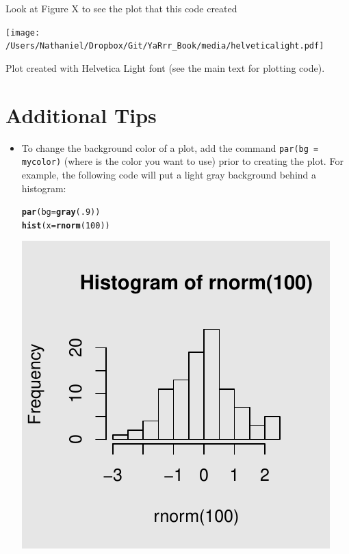 \documentclass{tufte-book}\usepackage[]{graphicx}\usepackage[]{color}
\makeatletter
\def\maxwidth{ %
  \ifdim\Gin@nat@width>\linewidth
    \linewidth
  \else
    \Gin@nat@width
  \fi
}
\newcommand{\hlnum}[1]{\textcolor[rgb]{0.686,0.059,0.569}{#1}}%
\newcommand{\hlstd}[1]{\textcolor[rgb]{0.345,0.345,0.345}{#1}}%
\newcommand{\hlkwc}[1]{\textcolor[rgb]{0.333,0.667,0.333}{#1}}%
\newcommand{\hlkwd}[1]{\textcolor[rgb]{0.737,0.353,0.396}{\textbf{#1}}}%
\newenvironment{kframe}{%
 \def\at@end@of@kframe{}%
 \ifinner\ifhmode%
  \def\at@end@of@kframe{\end{minipage}}%
  \begin{minipage}{\columnwidth}%
 \fi\fi%
 \def\FrameCommand##1{\hskip\@totalleftmargin \hskip-\fboxsep
 \colorbox{shadecolor}{##1}\hskip-\fboxsep
     \hskip-\linewidth \hskip-\@totalleftmargin \hskip\columnwidth}%
 \MakeFramed {\advance\hsize-\width
   \@totalleftmargin\z@ \linewidth\hsize
   \@setminipage}}%
 {\par\unskip\endMakeFramed%
 \at@end@of@kframe}
\newenvironment{knitrout}{}{} %
\makeatother
\begin{document}
Look at Figure X to see the plot that this code created

\begin{marginfigure}
\texttt{[image: /Users/Nathaniel/Dropbox/Git/YaRrr\_Book/media/helveticalight.pdf]}
\caption{Plot created with Helvetica Light font (see the main text for plotting code).}
\label{fig:helvetica}
\end{marginfigure}


\pagebreak
\section{Additional Tips}

\begin{itemize}


  \item To change the background color of a plot, add the command \texttt{par(bg = mycolor)} (where  is the color you want to use) prior to creating the plot. For example, the following code will put a light gray background behind a histogram:

\begin{knitrout}
\color{fgcolor}\begin{kframe}
\begin{alltt}
\hlkwd{par}\hlstd{(}\hlkwc{bg} \hlstd{=} \hlkwd{gray}\hlstd{(}\hlnum{.9}\hlstd{))}
\hlkwd{hist}\hlstd{(}\hlkwc{x} \hlstd{=} \hlkwd{rnorm}\hlstd{(}\hlnum{100}\hlstd{))}
\end{alltt}
\end{kframe}
\includegraphics[width=\maxwidth]{figure/unnamed-chunk-247-1} 


\end{knitrout}
\end{itemize}
\end{document}
